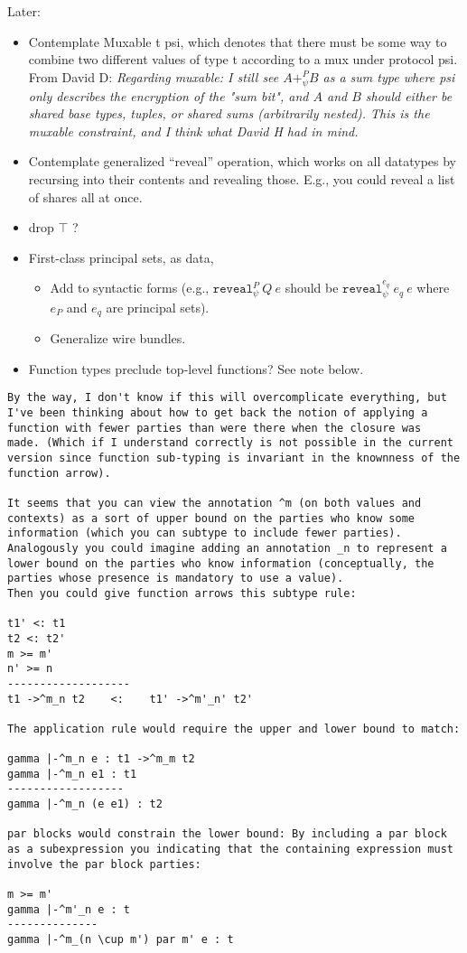 \documentclass[10pt]{article}
\newcommand{\kw}[1]{\ensuremath{\mathtt{#1}}}
\newcommand{\ereveal}[4]{\ensuremath{\kw{reveal}^{#1}_{#4}~{#2}~{#3}}}
\begin{document}
Later:
\begin{itemize}
\item Contemplate Muxable t psi, which denotes that there must be some
  way to combine two different values of type t according to a mux
  under protocol psi. From David D: \emph{Regarding muxable: I still see $A +^P_{\psi} B$ as a sum type where psi only describes the encryption of the "sum bit", and $A$ and $B$ should either be shared base types, tuples, or shared sums (arbitrarily nested). This is the muxable constraint, and I think what David H had in mind.}
\item Contemplate generalized ``reveal'' operation, which works on all
  datatypes by recursing into their contents and revealing
  those. E.g., you could reveal a list of shares all at once.
\item drop $\top$ ?
\item First-class principal sets, as data,
  \begin{itemize}
    \item Add to syntactic forms (e.g., $\ereveal{P}{Q}{e}{\psi}$ should be
    $\ereveal{e_q}{e_q}{e}{\psi}$ where $e_P$ and $e_q$ are principal
    sets).
  \item Generalize wire bundles.
  \end{itemize}
\item Function types preclude top-level functions? See note below.
\end{itemize}

\begin{verbatim}
By the way, I don't know if this will overcomplicate everything, but
I've been thinking about how to get back the notion of applying a
function with fewer parties than were there when the closure was
made. (Which if I understand correctly is not possible in the current
version since function sub-typing is invariant in the knownness of the
function arrow). 

It seems that you can view the annotation ^m (on both values and
contexts) as a sort of upper bound on the parties who know some
information (which you can subtype to include fewer parties). 
Analogously you could imagine adding an annotation _n to represent a
lower bound on the parties who know information (conceptually, the
parties whose presence is mandatory to use a value). 
Then you could give function arrows this subtype rule:

t1' <: t1
t2 <: t2'
m >= m'
n' >= n
-------------------
t1 ->^m_n t2    <:    t1' ->^m'_n' t2'

The application rule would require the upper and lower bound to match: 

gamma |-^m_n e : t1 ->^m_m t2
gamma |-^m_n e1 : t1
------------------
gamma |-^m_n (e e1) : t2

par blocks would constrain the lower bound: By including a par block
as a subexpression you indicating that the containing expression must
involve the par block parties: 

m >= m'
gamma |-^m'_n e : t
--------------
gamma |-^m_(n \cup m') par m' e : t
\end{verbatim}
\end{document}
